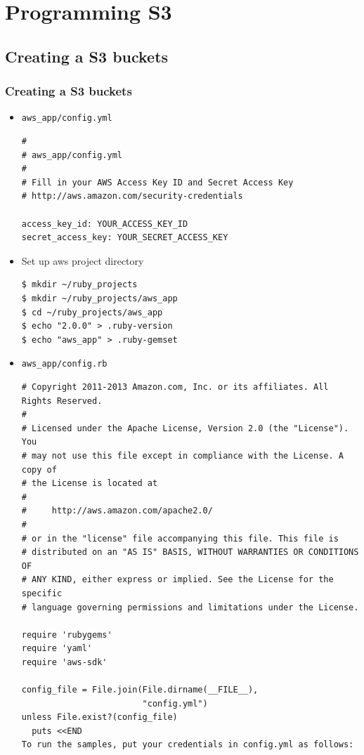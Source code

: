 \documentclass{beamer}
\begin{document}
\section{Programming S3}
\subsection{Creating a S3 buckets}
\begin{frame}
\frametitle{Creating a S3 buckets}
\begin{itemize}
\item \texttt{aws\_app/config.yml}
\lstset{language=shell, escapechar=!}
\begin{lstlisting}[escapechar=!]
#
# aws_app/config.yml
#
# Fill in your AWS Access Key ID and Secret Access Key
# http://aws.amazon.com/security-credentials
               
access_key_id: YOUR_ACCESS_KEY_ID
secret_access_key: YOUR_SECRET_ACCESS_KEY
\end{lstlisting}

\item Set up aws project directory
\lstset{language=shell, escapechar=!}
\begin{lstlisting}[escapechar=!]
$ mkdir ~/ruby_projects
$ mkdir ~/ruby_projects/aws_app
$ cd ~/ruby_projects/aws_app
$ echo "2.0.0" > .ruby-version
$ echo "aws_app" > .ruby-gemset
\end{lstlisting}

\item \texttt{aws\_app/config.rb}
\lstset{language=Ruby, style=eclipse}
\begin{lstlisting}[escapechar=$]
# Copyright 2011-2013 Amazon.com, Inc. or its affiliates. All Rights Reserved.
#
# Licensed under the Apache License, Version 2.0 (the "License"). You
# may not use this file except in compliance with the License. A copy of
# the License is located at
#
#     http://aws.amazon.com/apache2.0/
#
# or in the "license" file accompanying this file. This file is
# distributed on an "AS IS" BASIS, WITHOUT WARRANTIES OR CONDITIONS OF
# ANY KIND, either express or implied. See the License for the specific
# language governing permissions and limitations under the License.

require 'rubygems'
require 'yaml'
require 'aws-sdk'

config_file = File.join(File.dirname(__FILE__),
                        "config.yml")
unless File.exist?(config_file)
  puts <<END
To run the samples, put your credentials in config.yml as follows:


\end{lstlisting}
\end{itemize}
\end{frame}
\end{document}
